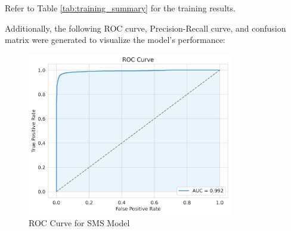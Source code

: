 \documentclass{article}
\begin{document}
\noindent
Refer to Table \ref{tab:training_summary} for the training results.
\newline



\noindent
Additionally, the following ROC curve, Precision-Recall curve, and confusion matrix were generated to visualize the model's performance:

\begin{figure}[htbp]
    \centering
    \includegraphics[width=0.8\textwidth]{../analysis/sms/randomforest/roc_curve.png}
    \caption{ROC Curve for SMS Model}
    \label{fig:roc_curve_2}
\end{figure}
\end{document}

